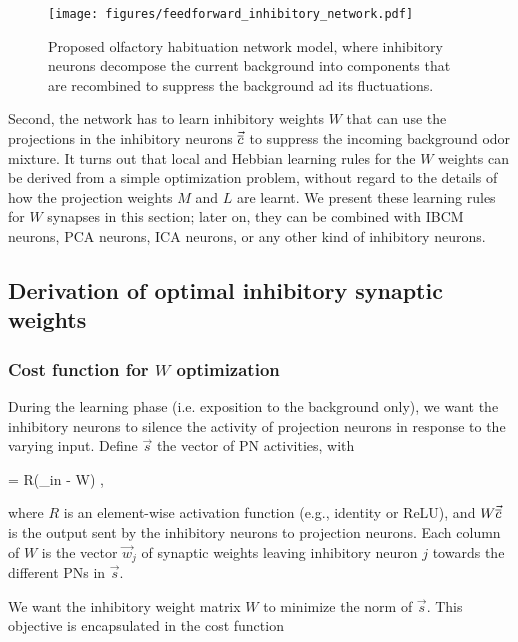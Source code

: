 \begin{figure}
	\centering
	\texttt{[image: figures/feedforward\_inhibitory\_network.pdf]}
	\caption{Proposed olfactory habituation network model, where inhibitory neurons decompose the current background into components that are recombined to suppress the background ad its fluctuations. }
	\label{fig:inhibition_network}
\end{figure}

Second, the network has to learn inhibitory weights $W$ that can use the projections in the inhibitory neurons $\vec{\overline{c}}$ to suppress the incoming background odor mixture. It turns out that local and Hebbian learning rules for the $W$ weights can be derived from a simple optimization problem, without regard to the details of how the projection weights $M$ and $L$ are learnt. We present these learning rules for $W$ synapses in this section; later on, they can be combined with IBCM neurons, PCA neurons, ICA neurons, or any other kind of inhibitory neurons. 

\subsection{Derivation of optimal inhibitory synaptic weights}
\label{subsect:optimal_inhib_weights}

\subsubsection{Cost function for $W$ optimization}
\label{subsubsect:cost_function}

During the learning phase (i.e. exposition to the background only), we want the inhibitory neurons to silence the activity of projection neurons in response to the varying input. Define $\vec{s}$ the vector of PN activities, with 

\beq
	= R(_{in} -  W)   \quad ,
	\label{eq:pn_relu}
\eeq

where $R$ is an element-wise activation function (e.g., identity or ReLU), and $W\vec{\overline{c}}$ is the output sent by the inhibitory neurons to projection neurons. Each column of $W$ is the vector $\vec{w}_j$ of synaptic weights leaving inhibitory neuron $j$ towards the different PNs in $\vec{s}$. 

We want the inhibitory weight matrix $W$ to minimize the norm of $\vec{s}$. This objective is encapsulated in the cost function

